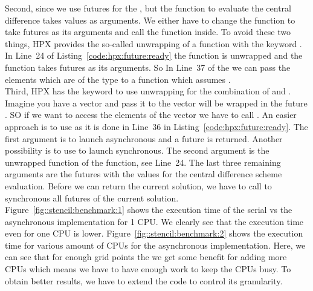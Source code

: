 Second, since we use futures for the , but the function to evaluate the central difference  takes  values as arguments. We either have to change the function to take futures as its arguments and call the  function inside. To avoid these two things, HPX provides the so-called unwrapping of a function with the keyword . In Line~24 of Listing~\ref{code:hpx:future:ready} the function  is unwrapped and the function  takes futures as its arguments. So In Line~37 of the  we can pass the  elements which are of the type  to a function which assumes .\\

Third, HPX has the keyword  to use unwrapping for the combination of  and . Imagine you have a vector  and pass it to  the vector  will be wrapped in the future . SO if we want to access the elements of the vector we have to call . An easier approach is to use  as it is done in Line~36 in Listing~\ref{code:hpx:future:ready}. The first argument is  to launch asynchronous and a future is returned. Another possibility is to use  to launch synchronous. The second argument is the unwrapped function of the  function, see Line~24. The last three remaining arguments are the futures with the values for the central difference scheme evaluation. Before we can return the current solution, we have to call  to synchronous all futures of the current solution.\\

Figure~\ref{fig::stencil:benchmark:1} shows the execution time of the serial vs the asynchronous implementation for 1 CPU. We clearly see that the execution time even for one CPU is lower. Figure~\ref{fig::stencil:benchmark:2} shows the execution time for various amount of CPUs for the asynchronous implementation. Here, we can see that for enough grid points the we get some benefit for adding more CPUs which means we have to have enough work to keep the CPUs busy. To obtain better results, we have to extend the code to control its granularity.

